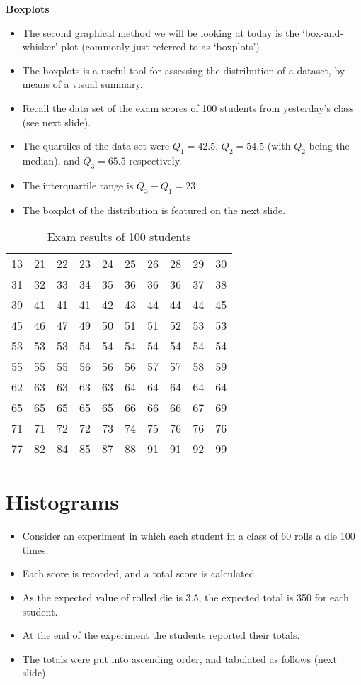 \documentclass[]{report}
\begin{document}
{
\textbf{Boxplots}
\begin{itemize}
\item The second graphical method we will be looking at today is the `box-and-whisker' plot (commonly just referred to as `boxplots')
\item The boxplots is a useful tool for assessing the distribution of a dataset, by means of a visual summary.
\item Recall the data set of the exam scores of 100 students from yesterday's class (see next slide).
\item The quartiles of the data set were $Q_1 = 42.5$, $Q_2 = 54.5$ (with $Q_2$ being the median), and $Q_3 =  65.5$ respectively.
\item The interquartile range is $Q_3 - Q_1 = 23$
\item The boxplot of the distribution is featured on the next slide.
\end{itemize}
}
{
\begin{table}[ht]
\caption{Exam results of 100 students} %
\centering %
\begin{tabular}{|c ccc ccc ccc|} %
\hline

13&21&22&23&24&25&26&28&29&30\\31&32&33&34&35& 36&36&36&37&38\\
39&41&41&41&42&43&44&44&44&45\\45&46&47&49&50& 51&51&52&53&53\\
53&53&53&54&54&54&54&54&54&54\\55&55&55&56&56& 56&57&57&58&59\\
62&63&63&63&63&64&64&64&64&64\\65&65&65&65&65& 66&66&66&67&69\\
71&71&72&72&73&74&75&76&76&76\\77&82&84&85&87& 88&91&91&92&99\\ \hline
\end{tabular}
\end{table}
}


\newpage
{
\section{Histograms}
\begin{itemize}
\item  Consider an experiment in which each student in a class of 60 rolls a die 100 times.
\item  Each score is recorded, and a total score is calculated.
\item  As the expected value of rolled die is 3.5, the expected total is 350 for each student.
\item  At the end of the experiment the students reported their totals.
\item  The totals were put into ascending order, and tabulated as follows (next slide).
\end{itemize}

}
\end{document}
